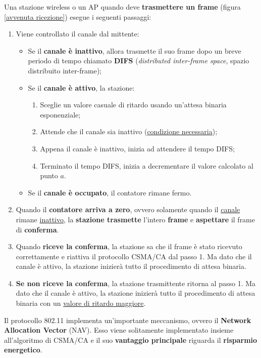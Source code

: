 \documentclass[a4paper]{article}
\begin{document}
	\noindent
	Una stazione wireless o un AP quando deve \textbf{trasmettere un frame} (figura \ref{avvenuta ricezione}) esegue i seguenti passaggi:
	\begin{enumerate}
		\item Viene controllato il canale dal mittente:
		\begin{itemize}
			\item Se il \textbf{canale è inattivo}, allora trasmette il suo frame dopo un breve periodo di tempo chiamato \textbf{DIFS} (\emph{distributed inter-frame space}, spazio distribuito inter-frame);
			
			\item Se il \textbf{canale è attivo}, la stazione:
			\begin{enumerate}
				\item Sceglie un valore casuale di ritardo usando un'attesa binaria esponenziale;
				\item Attende che il canale sia inattivo (\underline{condizione necessaria});
				\item Appena il canale è inattivo, inizia ad attendere il tempo DIFS;
				\item Terminato il tempo DIFS, inizia a decrementare il valore calcolato al punto $a$.
			\end{enumerate}
			
			\item Se il \textbf{canale è occupato}, il contatore rimane fermo.
		\end{itemize}
		
		\item Quando il \textbf{contatore arriva a zero}, ovvero solamente quando il \underline{canale} rimane \underline{inattivo}, la \textbf{stazione trasmette} l’intero \textbf{frame} e \textbf{aspettare} il frame di \textbf{conferma}.
		
		\item Quando \textbf{riceve la conferma}, la stazione sa che il frame è stato ricevuto correttamente e riattiva il protocollo CSMA/CA dal passo 1. Ma dato che il canale è attivo, la stazione inizierà tutto il procedimento di attesa binaria.
		
		\item \textbf{Se non riceve la conferma}, la stazione trasmittente ritorna al passo 1. Ma dato che il canale è attivo, la stazione inizierà tutto il procedimento di attesa binaria con un \underline{valore di ritardo maggiore}.
	\end{enumerate}
	\noindent
	Il protocollo 802.11 implementa un'importante meccanismo, ovvero il \textcolor{Red3}{\textbf{Network Allocation Vector}} (NAV). Esso viene solitamente implementato insieme all'algoritmo di CSMA/CA e il suo \textbf{vantaggio principale} riguarda il \textbf{risparmio energetico}.
	
\end{document}
